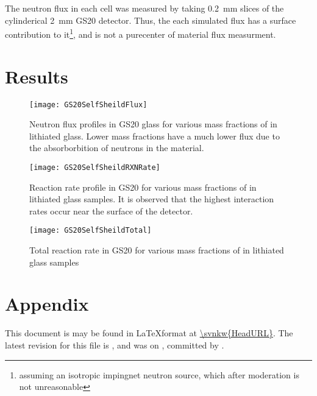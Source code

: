 \documentclass[draftcls,onecolumn]{IEEEtran}
\begin{document}
The neutron flux in each cell was measured by taking \SI{0.2}{\mm} slices of the cylinderical \SI{2}{\mm} GS20 detector.
Thus, the each simulated flux has a surface contribution to it\footnote{assuming an isotropic impingnet neutron source, which after moderation is not unreasonable}, and is not a purecenter of material flux measurment.

\section{Results}
\begin{figure}
	\texttt{[image: GS20SelfSheildFlux]}
	\caption[Flux Profile through GS20]{Neutron flux profiles in GS20 glass for various mass fractions of  in lithiated glass. Lower mass fractions have a much lower flux due to the absorborbition of neutrons in the material.}
	\label{fig:Flux}
\end{figure}
\begin{figure}
	\texttt{[image: GS20SelfSheildRXNRate]}
	\caption[Reaction Rate through GS20]{Reaction rate profile in GS20 for various mass fractions of  in lithiated glass samples. It is observed that the highest interaction rates occur near the surface of the detector.}
	\label{fig:RxnRate}
\end{figure}
\begin{figure}
	\texttt{[image: GS20SelfSheildTotal]}
	\caption[Total Reaction Rate]{Total reaction rate in GS20 for various mass fractions of  in lithiated glass samples}
	\label{fig:TotalRxn}
\end{figure}

\section{Appendix}
This document is may be found in \LaTeX format at \url{\svnkw{HeadURL}}.  
The latest revision for this file is \svnrev, and was on \svndate, committed by \svnauthor.
\end{document}

